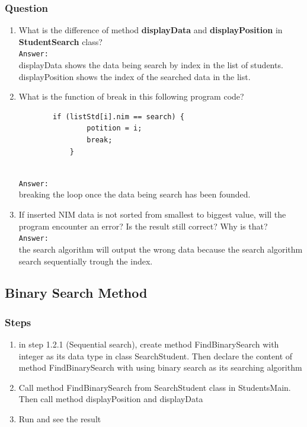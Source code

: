 \documentclass[12pt,titlepage]{article}
\begin{document}
\subsubsection{Question}

\begin{enumerate}
    \item What is the difference of method \textbf{displayData} and \textbf{displayPosition} in \textbf{StudentSearch} class?
    \mbox{}\\
    \texttt{Answer: }
    \mbox{}\\
    displayData shows the data being search by index in the list of students. displayPosition shows the index of the searched data in the list.
    \item What is the function of break in this following program code?
    \begin{verbatim}
        if (listStd[i].nim == search) {
                potition = i;
                break;
            }
    \end{verbatim}
    \mbox{}\\
    \texttt{Answer: }
    \mbox{}\\
    breaking the loop once the data being search has been founded.
    \item If inserted NIM data is not sorted from smallest to biggest value, will the program encounter an error? Is the result still correct? Why is that?
    \mbox{}\\
    \texttt{Answer: }
    \mbox{}\\
    the search algorithm will output the wrong data because the search algorithm search sequentially trough the index.
\end{enumerate}

\subsection{Binary Search Method}

\subsubsection{Steps}

\begin{enumerate}
    \item in step 1.2.1 (Sequential search), create method FindBinarySearch with integer as its data type in class SearchStudent. Then declare the content of method FindBinarySearch with using binary search as its searching algorithm
    \item Call method FindBinarySearch from SearchStudent class in StudentsMain. Then call method
    displayPosition and displayData
    \item Run and see the result
\end{enumerate}
\end{document}
